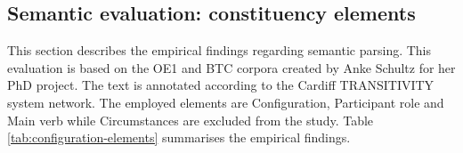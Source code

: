 
\subsection{Semantic evaluation: constituency elements}
\label{sec:semantic-constituents}
    This section describes the empirical findings regarding semantic parsing. This evaluation is based on the OE1 and BTC corpora created by Anke Schultz for her PhD project. The text is annotated according to the Cardiff TRANSITIVITY system network. The employed elements are Configuration, Participant role and Main verb while Circumstances are excluded from the study. Table \ref{tab:configuration-elements} summarises the empirical findings. 

    \begin{table}[!ht]
        \caption{The evaluation statistics for the main semantic elements}
        \label{tab:configuration-elements}
    \end{table}
